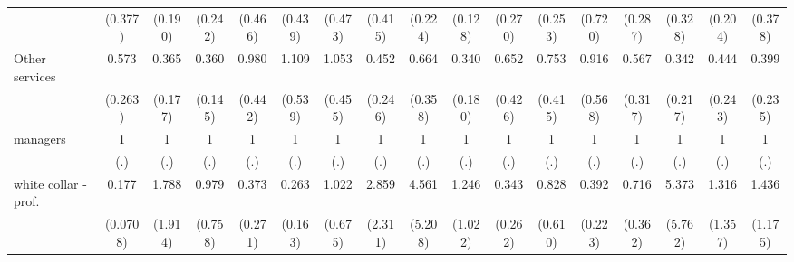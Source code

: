 {\begin{tabular}{l*{16}{c}}
                    &     (0.377)         &     (0.190)         &     (0.242)         &     (0.466)         &     (0.439)         &     (0.473)         &     (0.415)         &     (0.224)         &     (0.128)         &     (0.270)         &     (0.253)         &     (0.720)         &     (0.287)         &     (0.328)         &     (0.204)         &     (0.378)         \\
[1em]
Other services      &       0.573         &       0.365\sym{*}  &       0.360\sym{*}  &       0.980         &       1.109         &       1.053         &       0.452         &       0.664         &       0.340\sym{*}  &       0.652         &       0.753         &       0.916         &       0.567         &       0.342         &       0.444         &       0.399         \\
                    &     (0.263)         &     (0.177)         &     (0.145)         &     (0.442)         &     (0.539)         &     (0.455)         &     (0.246)         &     (0.358)         &     (0.180)         &     (0.426)         &     (0.415)         &     (0.568)         &     (0.317)         &     (0.217)         &     (0.243)         &     (0.235)         \\
[1em]
managers            &           1         &           1         &           1         &           1         &           1         &           1         &           1         &           1         &           1         &           1         &           1         &           1         &           1         &           1         &           1         &           1         \\
                    &         (.)         &         (.)         &         (.)         &         (.)         &         (.)         &         (.)         &         (.)         &         (.)         &         (.)         &         (.)         &         (.)         &         (.)         &         (.)         &         (.)         &         (.)         &         (.)         \\
[1em]
white collar - prof.&       0.177\sym{***}&       1.788         &       0.979         &       0.373         &       0.263\sym{*}  &       1.022         &       2.859         &       4.561         &       1.246         &       0.343         &       0.828         &       0.392         &       0.716         &       5.373         &       1.316         &       1.436         \\
                    &    (0.0708)         &     (1.914)         &     (0.758)         &     (0.271)         &     (0.163)         &     (0.675)         &     (2.311)         &     (5.208)         &     (1.022)         &     (0.262)         &     (0.610)         &     (0.223)         &     (0.362)         &     (5.762)         &     (1.357)         &     (1.175)         \\

\end{tabular}}
